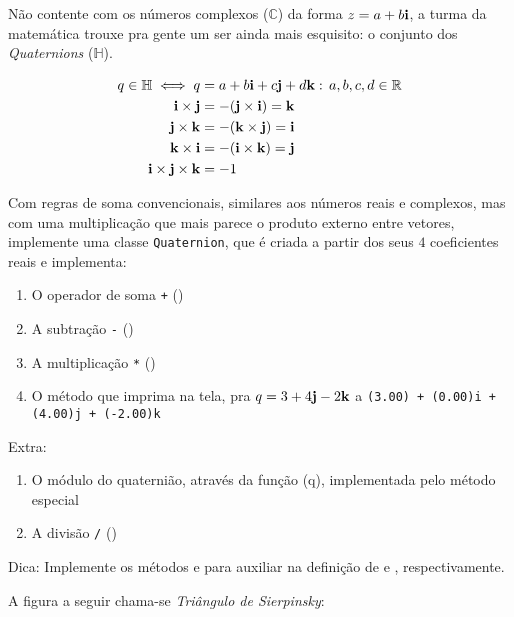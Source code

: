 \documentclass[12pt]{article}
\begin{document}
	
	Não contente com os números complexos ($\mathbb{C}$) da forma $z = a + b\mathbf{i}$, a turma da matemática trouxe pra gente um ser ainda mais esquisito: o conjunto dos \emph{Quaternions} ($\mathbb{H}$).
	
	\begin{align*}
	q \in \mathbb{H} \iff q &= a + b \mathbf{i} + c \mathbf{j} + d \mathbf{k} : \, a,b,c,d \in \mathbb{R}\\
	\mathbf{i} \times \mathbf{j} &= -(\mathbf{j} \times \mathbf{i}) = \mathbf{k}\\
	\mathbf{j} \times \mathbf{k} &= -(\mathbf{k} \times \mathbf{j}) = \mathbf{i}\\
	\mathbf{k} \times \mathbf{i} &= -(\mathbf{i} \times \mathbf{k}) = \mathbf{j}\\
	\mathbf{i} \times \mathbf{j} \times \mathbf{k} &= -1	
	\end{align*}
	
	Com regras de soma convencionais, similares aos números reais e complexos, mas com uma multiplicação que mais parece o produto externo entre vetores, implemente uma classe \texttt{Quaternion}, que é criada a partir dos seus $4$ coeficientes reais e implementa:
	\begin{enumerate}
		\item O operador de soma \texttt{+} ()
		\item A subtração \texttt{-} ()
		\item A multiplicação \texttt{*} ()
		\item O método  que imprima na tela, pra $q = 3 + 4\mathbf{j} - 2\mathbf{k}$ a  \texttt{(3.00) + (0.00)i + (4.00)j + (-2.00)k}
	\end{enumerate}
	
	Extra:
	\begin{enumerate}
		\item O módulo do quaternião, através da função (q), implementada pelo método especial 
		\item A divisão \texttt{\slash} ()
	\end{enumerate}

	Dica:
	Implemente os métodos  e  para auxiliar na definição de  e , respectivamente.
	
	
		
	
	A figura a seguir chama-se \emph{Triângulo de Sierpinsky}:
	
\end{document}
